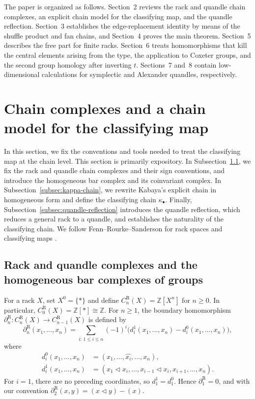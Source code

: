 \documentclass[11pt]{article}
\newcommand{\ZZ}{\mathbb Z}
\newcommand{\R}{\mathrm R}
\begin{document}
The paper is organized as follows. Section~2 reviews the rack and quandle chain complexes, an explicit chain model for the classifying map, and the quandle reflection. Section~3 establishes the edge-replacement identity by means of the shuffle product and fan chains, and Section~4 proves the main theorem. Section~5 describes the free part for finite racks. Section~6 treats homomorphisms that kill the central elements arising from the type, the application to Coxeter groups, and the second group homology after inverting $t$. Sections~7 and~8 contain low-dimensional calculations for symplectic and Alexander quandles, respectively.

\section{Chain complexes and a chain model for the classifying map}

In this section, we fix the conventions and tools needed to treat the classifying map at the chain level. This section is primarily expository. In Subsection~\ref{subsec:rack-quandle-complexes}, we fix the rack and quandle chain complexes and their sign conventions, and introduce the homogeneous bar complex and its coinvariant complex. In Subsection~\ref{subsec:kappa-chain}, we rewrite Kabaya's explicit chain in homogeneous form and define the classifying chain $\kappa_\bullet$. Finally, Subsection~\ref{subsec:quandle-reflection} introduces the quandle reflection, which reduces a general rack to a quandle, and establishes the naturality of the classifying chain. We follow Fenn--Rourke--Sanderson for rack spaces and classifying maps \cite{FRS}.

\subsection{Rack and quandle complexes and the homogeneous bar complexes of groups}
\label{subsec:rack-quandle-complexes}

For a rack $X$, set $X^0=\{*\}$ and define $C_n^\R(X)=\ZZ[X^n]$ for $n\ge0$. In particular, $C_0^\R(X)=\ZZ[*]\cong\ZZ$. For $n\ge1$, the boundary homomorphism $\partial_n^\R\colon C_n^\R(X)\to C_{n-1}^\R(X)$ is defined by
\[
\partial_n^\R(x_1,\ldots,x_n)
=
\sum_{i:\,1\le i\le n}(-1)^i
\bigl(d_i^1(x_1,\ldots,x_n)-d_i^0(x_1,\ldots,x_n)\bigr),
\]
where
\[
\begin{aligned}
 d_i^0(x_1,\ldots,x_n)
 &= (x_1,\ldots,\widehat{x_i},\ldots,x_n),\\
 d_i^1(x_1,\ldots,x_n)
 &= (x_1\lhd x_i,\ldots,x_{i-1}\lhd x_i,x_{i+1},\ldots,x_n).
\end{aligned}
\]
For $i=1$, there are no preceding coordinates, so $d_1^1=d_1^0$. Hence $\partial_1^\R=0$, and with our convention $\partial_2^\R(x,y)=(x\lhd y)-(x)$.
\end{document}
